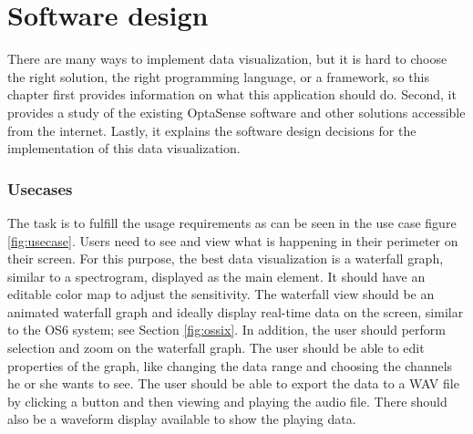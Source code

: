 
\chapter{Software design}\label{txt.design.design}

There are many ways to implement data visualization, but it is hard to choose the right solution, the right programming language, or a framework, so this chapter first provides information on what this application should do. Second, it provides a study of the existing OptaSense software and other solutions accessible from the internet. Lastly, it explains the software design decisions for the implementation of this data visualization.

\subsection{Usecases}\label{lab:usecases}\label{txt.design.sw.usecase}

The task is to fulfill the usage requirements as can be seen in the use case figure \ref{fig:usecase}. Users need to see and view what is happening in their perimeter on their screen. For this purpose, the best data visualization is a waterfall graph, similar to a spectrogram, displayed as the main element. It should have an editable color map to adjust the sensitivity. The waterfall view should be an animated waterfall graph and ideally display real-time data on the screen, similar to the OS6 system; see Section \ref{fig:ossix}. In addition, the user should perform selection and zoom on the waterfall graph. The user should be able to edit properties of the graph, like changing the data range and choosing the channels he or she wants to see. The user should be able to export the data to a WAV file by clicking a button and then viewing and playing the audio file. There should also be a waveform display available to show the playing data.

